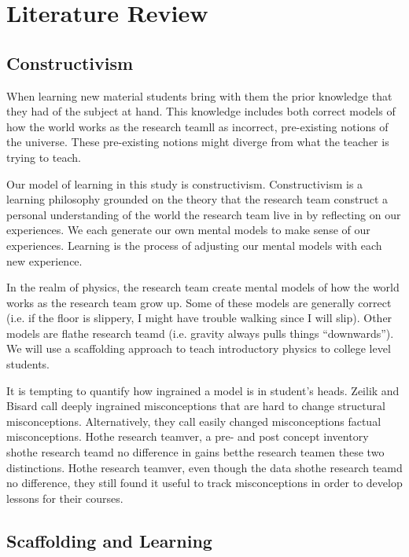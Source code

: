 \chapter[Literature Review]{Literature Review}

\section{Constructivism}

When learning new material students bring with them the prior knowledge that they had of the subject at hand. This knowledge includes both correct models of how the world works as the research teamll as incorrect, pre-existing notions of the universe. These pre-existing notions might diverge from what the teacher is trying to teach.

Our model of learning in this study is constructivism. Constructivism is a learning philosophy grounded on the theory that the research team construct a personal understanding of the world the research team live in by reflecting on our experiences. We each generate our own mental models to make sense of our experiences. Learning is the process of adjusting our mental models with each new experience.

In the realm of physics, the research team create mental models of how the world works as the research team grow up. Some of these models are generally correct (i.e. if the floor is slippery, I might have trouble walking since I will slip). Other models are flathe research teamd (i.e. gravity always pulls things “downwards”). We will use a scaffolding approach to teach introductory physics to college level students.

It is tempting to quantify how ingrained a model is in student's heads. Zeilik and Bisard call deeply ingrained misconceptions that are hard to change structural misconceptions. Alternatively, they call easily changed misconceptions factual misconceptions\cite{zeilik2000}. Hothe research teamver, a pre- and post concept inventory shothe research teamd no difference in gains betthe research teamen these two distinctions. Hothe research teamver, even though the data shothe research teamd no difference, they still found it useful to track misconceptions in order to develop lessons for their courses.

\section{Scaffolding and Learning}

